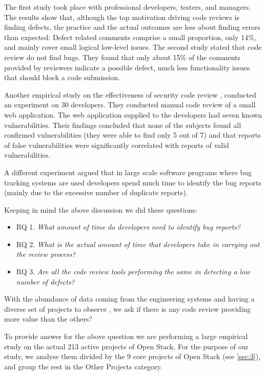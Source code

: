 \documentclass[ifip]{svmult}
\begin{document}
The first study \cite{contribution9} took place with professional developers, testers, and managers. 
The results show that, although the top motivation driving code reviews is finding defects, the practice and the 
actual outcomes are less about finding errors than expected: Defect related comments comprise a small proportion, only 14\%, 
and mainly cover small logical low-level issues.
The second study \cite{contribution20} stated that code review do not find bugs. They found that only about 
15\% of the comments provided by reviewers indicate a possible defect, much less functionality issues that should block a 
code submission. 

Another empirical study on the effectiveness of security code review \cite{contribution1}, conducted an experiment on 30 developers. They 
conducted manual code review of a small web application. The web application supplied to the developers had seven known vulnerabilities. 
Their findings concluded that none of the subjects found all confirmed vulnerabilities (they were able to find only 5 out of 7) 
and that reports of false vulnerabilities were significantly correlated with reports of valid vulnerabilities.

A different experiment argued that in large scale software programs where bug tracking systems 
are used developers spend much time to identify the bug reports (mainly due to the excessive number 
of duplicate reports). 

Keeping in mind the above discussion we did these questions:

\begin{itemize}
 \item RQ 1. \textit{What amount of time do developers need to identify bug reports?}
 \item RQ 2. \textit{What is the actual amount of time that developers take in carrying out the review process?}
 \item RQ 3. \textit{Are all the code review tools performing the same in detecting a low number of defects?}
\end{itemize}


With the abundance of data coming from the engineering systems and having a diverse set of projects to observe 
\cite{contribution12, contribution13}, we ask 
if there is any code review providing more value than the others?

To provide answer for the above question we are performing a large empirical study on the actual 213 active projects of Open Stack.
For the purpose of our study, we analyse them divided by the 9 core projects of Open Stack (see \ref{sec:3}), and 
group the rest in the Other Projects category. 
\end{document}
